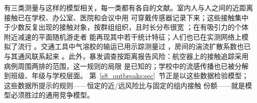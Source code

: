 有三类测量与这样的模型相关，每一类都有各自的文献。室内人与人之间的近距离接触已在学校、办公室、医院和会议中用
可穿戴传感器记录下来；这些接触集中于少数反复出现的接触对象，按群组组织，且时长分布很宽
\citep{cattuto2010dynamics,stehle2011high,genois2015data,genois2018can}；在有吸引力的个体附近减速的平面随机游走者
能再现其中若干统计特征\citep{starnini2013modeling}；人们也已在实测网络上模拟了流行
\citep{stehle2011simulation,gemmetto2014mitigation}。交通工具中气溶胶的输运已用示踪测量过
\citep{kinahan2021aerosol,woodward2022evaluation,ou2022}，房间的湍流扩散系数也已与其通风联系起来
\citep{cheng2011modeling}。此外，暴发调查按距离报告风险：航空器上的接触追踪采用病例周围两排的范围，这一规则的局限
是已知的\citep{hertzberg2016risk}；学校中的流感传播也已被分解到班级、年级与学校层面\citep{endo2021within}。
第~\ref{s8_outbreaks:sec}~节正是以这些数据检验模型；这些数据所提示的规则——恒定的近/远风险比与固定的组内接触
份额——就是模型必须胜过的通用竞争模型。

